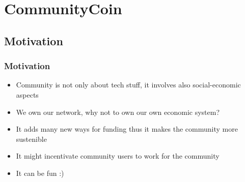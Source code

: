 \documentclass[usepdftitle=false,13pt]{beamer}
\begin{document}
\section{CommunityCoin}

\subsection{Motivation}

\begin{frame}\frametitle{Motivation}
	\begin{itemize}
		\item Community is not only about tech stuff, it involves also social-economic aspects
		\item We own our network, why not to own our own economic system?
		\item It adds many new ways for funding thus it makes the community more sustenible
		\item It might incentivate community users to work for the community
		\item It can be fun :)
	\end{itemize}
\end{frame}





\frame{\titlepage}
\end{document}
